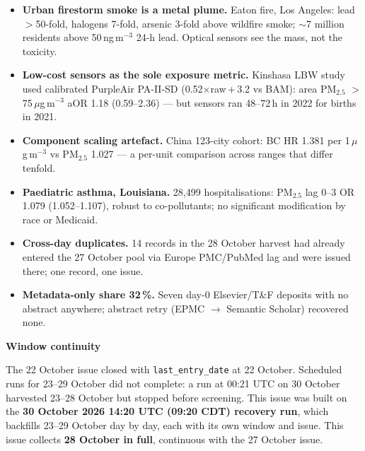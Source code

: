 \documentclass[10pt]{article}
\begin{document}
\footnotesize
\begin{itemize}

\item \textbf{Urban firestorm smoke is a metal plume.} Eaton fire, Los Angeles: lead $>$50-fold, halogens 7-fold, arsenic
3-fold above wildfire smoke; $\sim$7 million residents above 50\,ng\,m$^{-3}$ 24-h lead. Optical sensors see the mass,
not the toxicity.

\item \textbf{Low-cost sensors as the sole exposure metric.} Kinshasa LBW study used calibrated PurpleAir PA-II-SD
(0.52$\times$raw\,+\,3.2 vs BAM): area PM$_{2.5}$ $>$75\,$\mu$g\,m$^{-3}$ aOR 1.18 (0.59--2.36) --- but sensors ran
48--72\,h in 2022 for births in 2021.

\item \textbf{Component scaling artefact.} China 123-city cohort: BC HR 1.381 per 1\,$\mu$g\,m$^{-3}$ vs PM$_{2.5}$ 1.027
--- a per-unit comparison across ranges that differ tenfold.

\item \textbf{Paediatric asthma, Louisiana.} 28,499 hospitalisations: PM$_{2.5}$ lag 0--3 OR 1.079 (1.052--1.107),
robust to co-pollutants; no significant modification by race or Medicaid.

\item \textbf{Cross-day duplicates.} 14 records in the 28 October harvest had already entered the 27 October pool via
Europe PMC/PubMed lag and were issued there; one record, one issue.

\item \textbf{Metadata-only share 32\,\%.} Seven day-0 Elsevier/T\&F deposits with no abstract anywhere; abstract retry
(EPMC $\rightarrow$ Semantic Scholar) recovered none.

\end{itemize}

\vspace{2mm}

\begin{keybox}
{\sffamily\bfseries\footnotesize\color{Deep}Window continuity}\\[1.2mm]
{\fontsize{7.2}{8.8}\selectfont
The 22 October issue closed with \texttt{last\_entry\_date} at 22 October. Scheduled runs for 23--29 October did
not complete: a run at 00:21 UTC on 30 October harvested 23--28 October but stopped before screening. This issue was
built on the \textbf{30 October 2026 14:20 UTC (09:20 CDT) recovery run}, which backfills 23--29 October day by day, each with its
own window and issue. This issue collects \textbf{28 October in full}, continuous with the 27 October issue.\par}
\end{keybox}
\end{document}

